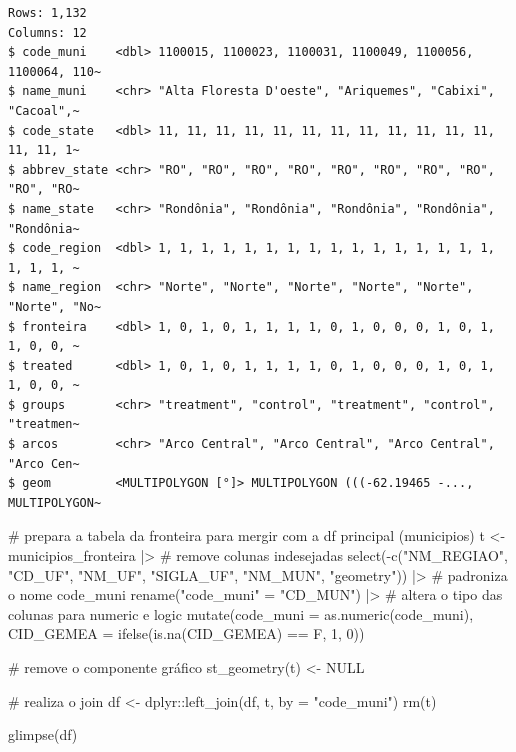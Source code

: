 \documentclass[
  letterpaper,
  DIV=11,
  numbers=noendperiod]{scrartcl}
\newenvironment{Shaded}{\begin{snugshade}}{\end{snugshade}}
\newcommand{\AttributeTok}[1]{\textcolor[rgb]{0.40,0.45,0.13}{#1}}
\newcommand{\CommentTok}[1]{\textcolor[rgb]{0.37,0.37,0.37}{#1}}
\newcommand{\ConstantTok}[1]{\textcolor[rgb]{0.56,0.35,0.01}{#1}}
\newcommand{\DecValTok}[1]{\textcolor[rgb]{0.68,0.00,0.00}{#1}}
\newcommand{\FunctionTok}[1]{\textcolor[rgb]{0.28,0.35,0.67}{#1}}
\newcommand{\NormalTok}[1]{\textcolor[rgb]{0.00,0.23,0.31}{#1}}
\newcommand{\OtherTok}[1]{\textcolor[rgb]{0.00,0.23,0.31}{#1}}
\newcommand{\SpecialCharTok}[1]{\textcolor[rgb]{0.37,0.37,0.37}{#1}}
\newcommand{\StringTok}[1]{\textcolor[rgb]{0.13,0.47,0.30}{#1}}
\begin{document}
\begin{verbatim}
Rows: 1,132
Columns: 12
$ code_muni    <dbl> 1100015, 1100023, 1100031, 1100049, 1100056, 1100064, 110~
$ name_muni    <chr> "Alta Floresta D'oeste", "Ariquemes", "Cabixi", "Cacoal",~
$ code_state   <dbl> 11, 11, 11, 11, 11, 11, 11, 11, 11, 11, 11, 11, 11, 11, 1~
$ abbrev_state <chr> "RO", "RO", "RO", "RO", "RO", "RO", "RO", "RO", "RO", "RO~
$ name_state   <chr> "Rondônia", "Rondônia", "Rondônia", "Rondônia", "Rondônia~
$ code_region  <dbl> 1, 1, 1, 1, 1, 1, 1, 1, 1, 1, 1, 1, 1, 1, 1, 1, 1, 1, 1, ~
$ name_region  <chr> "Norte", "Norte", "Norte", "Norte", "Norte", "Norte", "No~
$ fronteira    <dbl> 1, 0, 1, 0, 1, 1, 1, 1, 0, 1, 0, 0, 0, 1, 0, 1, 1, 0, 0, ~
$ treated      <dbl> 1, 0, 1, 0, 1, 1, 1, 1, 0, 1, 0, 0, 0, 1, 0, 1, 1, 0, 0, ~
$ groups       <chr> "treatment", "control", "treatment", "control", "treatmen~
$ arcos        <chr> "Arco Central", "Arco Central", "Arco Central", "Arco Cen~
$ geom         <MULTIPOLYGON [°]> MULTIPOLYGON (((-62.19465 -..., MULTIPOLYGON~
\end{verbatim}

\begin{Shaded}
\begin{Highlighting}[]
\CommentTok{\# prepara a tabela da fronteira para mergir com a df principal (municipios)}
\NormalTok{t }\OtherTok{\textless{}{-}}\NormalTok{ municipios\_fronteira }\SpecialCharTok{|\textgreater{}} 
  \CommentTok{\# remove colunas indesejadas}
  \FunctionTok{select}\NormalTok{(}\SpecialCharTok{{-}}\FunctionTok{c}\NormalTok{(}\StringTok{"NM\_REGIAO"}\NormalTok{, }\StringTok{"CD\_UF"}\NormalTok{, }\StringTok{"NM\_UF"}\NormalTok{, }\StringTok{"SIGLA\_UF"}\NormalTok{, }\StringTok{"NM\_MUN"}\NormalTok{, }\StringTok{"geometry"}\NormalTok{)) }\SpecialCharTok{|\textgreater{}} 
  \CommentTok{\# padroniza o nome code\_muni}
  \FunctionTok{rename}\NormalTok{(}\StringTok{"code\_muni"} \OtherTok{=} \StringTok{"CD\_MUN"}\NormalTok{) }\SpecialCharTok{|\textgreater{}} 
  \CommentTok{\# altera o tipo das colunas para numeric e logic}
  \FunctionTok{mutate}\NormalTok{(}\AttributeTok{code\_muni =} \FunctionTok{as.numeric}\NormalTok{(code\_muni),}
         \AttributeTok{CID\_GEMEA =} \FunctionTok{ifelse}\NormalTok{(}\FunctionTok{is.na}\NormalTok{(CID\_GEMEA) }\SpecialCharTok{==}\NormalTok{ F, }\DecValTok{1}\NormalTok{, }\DecValTok{0}\NormalTok{))}

\CommentTok{\# remove o componente gráfico}
\FunctionTok{st\_geometry}\NormalTok{(t) }\OtherTok{\textless{}{-}} \ConstantTok{NULL}

\CommentTok{\# realiza o join}
\NormalTok{df }\OtherTok{\textless{}{-}}\NormalTok{ dplyr}\SpecialCharTok{::}\FunctionTok{left\_join}\NormalTok{(df, t, }\AttributeTok{by =} \StringTok{"code\_muni"}\NormalTok{)}
\FunctionTok{rm}\NormalTok{(t)}

\FunctionTok{glimpse}\NormalTok{(df)}
\end{Highlighting}
\end{Shaded}
\end{document}
